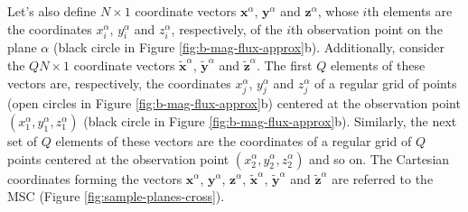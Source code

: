 \documentclass[galley,gc]{agutex}
\begin{document}
\begin{article}
Let's also define $N \times 1$ coordinate vectors $\mathbf{x}^{\alpha}$,
$\mathbf{y}^{\alpha}$ and $\mathbf{z}^{\alpha}$, whose
$i$th elements are the coordinates $x_{i}^{\alpha}$,
$y_{i}^{\alpha}$ and $z_{i}^{\alpha}$, respectively,
of the $i$th observation point on the plane $\alpha$
(black circle in Figure \ref{fig:b-mag-flux-approx}b).
Additionally, consider the $QN \times 1$ coordinate vectors 
$\tilde{\mathbf{x}}^{\alpha}$, $\tilde{\mathbf{y}}^{\alpha}$ and 
$\tilde{\mathbf{z}}^{\alpha}$. The first $Q$ elements of these
vectors are, respectively, the coordinates $x_{j}^{\alpha}$,
$y_{j}^{\alpha}$ and $z_{j}^{\alpha}$ of a regular grid of points
(open circles in Figure \ref{fig:b-mag-flux-approx}b) centered at 
the observation point $(x_{1}^{\alpha}, y_{1}^{\alpha}, z_{1}^{\alpha})$
(black circle in Figure \ref{fig:b-mag-flux-approx}b).
Similarly, the next set of $Q$ elements of these vectors are
the coordinates of a regular grid of $Q$ points centered
at the observation point $(x_{2}^{\alpha}, y_{2}^{\alpha}, z_{2}^{\alpha})$
and so on.
The Cartesian coordinates forming the vectors $\mathbf{x}^{\alpha}$,
$\mathbf{y}^{\alpha}$, $\mathbf{z}^{\alpha}$, 
$\tilde{\mathbf{x}}^{\alpha}$, $\tilde{\mathbf{y}}^{\alpha}$ and 
$\tilde{\mathbf{z}}^{\alpha}$ are referred to the MSC
(Figure \ref{fig:sample-planes-cross}).


\end{article}
\end{document}
